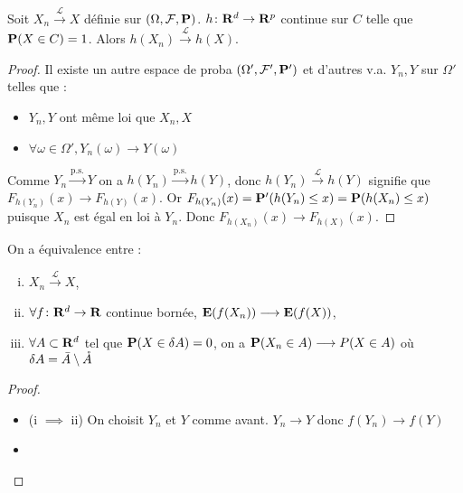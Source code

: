 	\begin{thm}[de continuité]
		Soit $X_n \overset{\mathcal{L}}{\longrightarrow} X$ définie sur $(\Omega,\mathcal{F},\mathbf{P})$.
		$h \colon \mathbf{R}^d \to \mathbf{R}^p$ continue sur $C$ telle que $\mathbf{P}(X \in C) = 1$.
		Alors  $h(X_n) \overset{\mathcal{L}}{\longrightarrow} h(X)$.
	\end{thm}

	\begin{proof}
		Il existe un autre espace de proba $(\Omega', \mathcal{F}', \mathbf{P}')$ et d'autres v.a. $Y_n, Y$ sur $\Omega'$ telles que :
		\begin{itemize}
			\item[\textbullet] $Y_n, Y$ ont même loi que $X_n, X$
			\item[\textbullet] $\forall \omega \in \Omega', Y_n(\omega) \longrightarrow Y(\omega)$
		\end{itemize}
		Comme $Y_n \overset{\text{p.s.}}{\longrightarrow} Y$ on a $h(Y_n) \overset{\text{p.s.}}{\longrightarrow} h(Y)$, donc $h(Y_n) \overset{\mathcal{L}}{\longrightarrow} h(Y)$ signifie que $F_{h(Y_n)}(x) \longrightarrow F_{h(Y)}(x)$.
		Or $F_{h(Y_n)}(x) = \mathbf{P}'(h(Y_n) \leq x) = \mathbf{P}(h(X_n) \leq x)$ puisque $X_n$ est égal en loi à $Y_n$.
		Donc $F_{h(X_n)}(x) \longrightarrow F_{h(X)}(x)$.
	\end{proof}
	
	\begin{thm}[de Portmanteau]
		On a équivalence entre :
		\begin{enumerate}[(i)]
			\item $X_n \overset{\mathcal{L}}{\longrightarrow} X$,
			\item $\forall f \colon \mathbf{R}^d \to \mathbf{R}$ continue bornée, $\mathbf{E}(f(X_n)) \longrightarrow \mathbf{E}(f(X))$,
			\item $\forall A \subset \mathbf{R}^d$ tel que $\mathbf{P}(X \in \delta A) = 0$, on a $\mathbf{P}(X_n \in A) \longrightarrow P(X \in A)$ où $\delta A = \Bar{A} \setminus \mathring{A}$
		\end{enumerate}
	\end{thm}

	\begin{proof}
		\begin{itemize}
			\item[\textbullet] (i $\implies$ ii)
				On choisit $Y_n$ et $Y$ comme avant.
				$Y_n \longrightarrow Y$ donc $f(Y_n) \longrightarrow f(Y)$ 
			\item[\textbullet] 
		\end{itemize}
	\end{proof}
